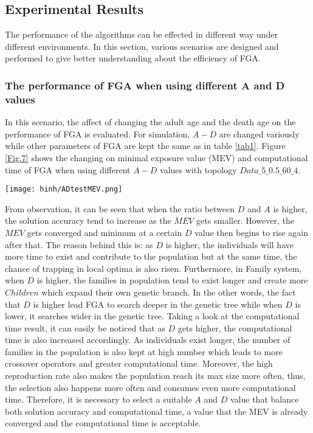 \documentclass[final]{elsarticle}
\begin{document}
\subsection{Experimental Results}
The performance of the algorithms can be effected in different way under different environments. In this section, various scenarios are designed and performed to give better understanding about the efficiency of FGA.
\subsubsection{The performance of FGA when using different A and D values}
In this scenario, the affect of changing the adult age and the death age on the performance of FGA is evaluated. For simulation, $A - D$ are changed variously while other parameters of FGA are kept the same as in table \ref{tab1}. Figure \ref{Fig.7} shows the changing on minimal exposure value (MEV) and computational time of FGA when using different $A-D$ values with topology $Data\_5\_0.5\_60\_4$.
\begin{figure*}[h]
	\texttt{[image: hinh/ADtestMEV.png]}
	\centering
	\caption{The Minimal Exposure Value when using different A-D values
	}
	\label{Fig.7}       %
\end{figure*}

From observation, it can be seen that when the ratio between $D$ and $A$ is higher, the solution accuracy tend to increase as the $MEV$ gets smaller. However, the $MEV$ gets converged and minimum at a certain $D$ value then begins to rise again after that. The reason behind this is: as $D$ is higher, the individuals will have more time to exist and contribute to the population but at the same time, the chance of trapping in local optima is also risen. Furthermore, in Family system, when $D$ is higher, the families in population tend to exist longer and create more $Children $ which expand their own genetic branch. In the other words, the fact that $D$ is higher lead FGA to search deeper in the genetic tree while when $D$ is lower, it searches wider in the genetic tree. Taking a look at the computational time result, it can easily be noticed that as $D$ gets higher, the computational time is also increased accordingly. As individuals exist longer, the number of families in the population is also kept at high number which leads to more crossover operators and greater computational time. Moreover, the high reproduction rate also makes the population reach its max size more often, thus, the selection also happens more often and consumes even more computational time. Therefore, it is necessary to select a suitable $A$ and $D$ value that balance both solution accuracy and computational time, a value that the MEV is already converged and the computational time is acceptable.  
\end{document}
